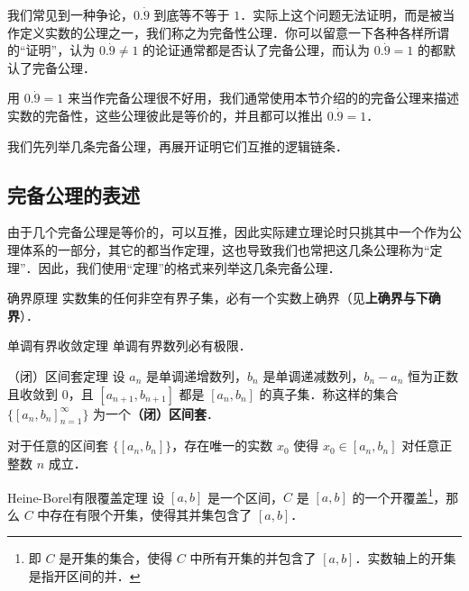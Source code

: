 


我们常见到一种争论，$0.\dot{9}$ 到底等不等于 $1$．实际上这个问题无法证明，而是被当作定义实数的公理之一，我们称之为完备性公理．你可以留意一下各种各样所谓的“证明”，认为 $0.\dot{9}\neq 1$ 的论证通常都是否认了完备公理，而认为 $0.\dot{9}=1$ 的都默认了完备公理．

用 $0.\dot{9}=1$ 来当作完备公理很不好用，我们通常使用本节介绍的的完备公理来描述实数的完备性，这些公理彼此是等价的，并且都可以推出 $0.\dot{9}=1$．

我们先列举几条完备公理，再展开证明它们互推的逻辑链条．

\subsection{完备公理的表述}

由于几个完备公理是等价的，可以互推，因此实际建立理论时只挑其中一个作为公理体系的一部分，其它的都当作定理，这也导致我们也常把这几条公理称为“定理”．因此，我们使用“定理”的格式来列举这几条完备公理．

\begin{theorem}{确界原理}\label{RCompl_the1}
实数集的任何非空有界子集，必有一个实数上确界（见\textbf{上确界与下确界}）．
\end{theorem}

\begin{theorem}{单调有界收敛定理}\label{RCompl_the2}
单调有界数列必有极限．
\end{theorem}

\begin{theorem}{（闭）区间套定理}\label{RCompl_the3}
设 $a_n$ 是单调递增数列，$b_n$ 是单调递减数列，$b_n-a_n$ 恒为正数且收敛到 $0$，且 $[a_{n+1}, b_{n+1}]$ 都是 $[a_n, b_n]$ 的真子集．称这样的集合 $\{[a_n, b_n]_{n=1}^\infty\}$ 为一个\textbf{（闭）区间套}．

对于任意的区间套 $\{[a_n, b_n]\}$，存在唯一的实数 $x_0$ 使得 $x_0\in [a_n, b_n]$ 对任意正整数 $n$ 成立．
\end{theorem}

\begin{theorem}{Heine-Borel有限覆盖定理}\label{RCompl_the4}
设 $[a, b]$ 是一个区间，$C$ 是 $[a, b]$ 的一个开覆盖\footnote{即 $C$ 是开集的集合，使得 $C$ 中所有开集的并包含了 $[a, b]$．实数轴上的开集是指开区间的并．}，那么 $C$ 中存在有限个开集，使得其并集包含了 $[a, b]$．
\end{theorem}

